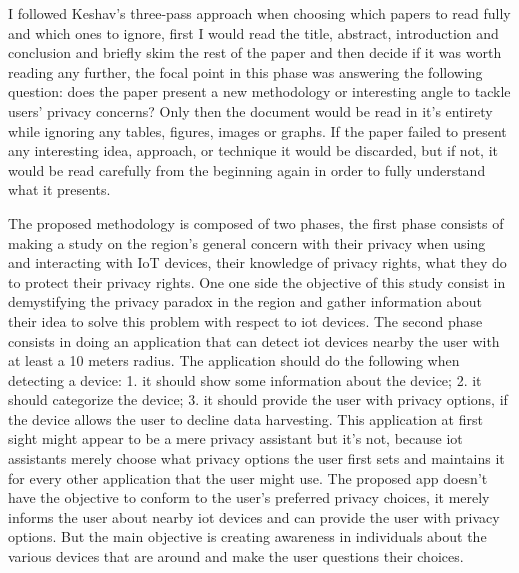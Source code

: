 \documentclass[conference]{IEEEtran}
\begin{document}
I followed Keshav's three-pass approach \cite{KeshavHow} when choosing which
papers to read fully and which ones to ignore, first I would read the title, abstract,
introduction and conclusion and briefly skim the rest of the paper and then
decide if it was worth reading any further, the focal point in this phase was
answering the following question: does the paper present a new methodology or
interesting angle to tackle users' privacy concerns? Only then the document would
be read in it's entirety while ignoring any tables, figures, images or graphs.
If the paper failed to present any interesting idea, approach, or
technique it would be discarded, but if not, it would be read carefully from
the beginning again in order to fully understand what it presents.




The proposed methodology is composed of two phases, the first phase consists of
making a study on the region's general concern with their privacy when
using and interacting with IoT devices, their knowledge of privacy rights, what they do to
protect their privacy rights. One one side the objective of this study
consist in demystifying the privacy paradox in the region and gather
information about their idea to solve this problem with respect
to iot devices.
The second phase consists in doing an application that can detect iot devices
nearby the user with at least a 10 meters radius. The application should
do the following when detecting a device:
1. it should show some information about the device;
2. it should categorize the device;
3. it should provide the user with privacy options, if the device allows the
user to decline data harvesting.
This application at first sight might appear to be a mere privacy assistant but
it's not, because iot assistants merely choose what privacy options
the user first sets and maintains it for every other application that the user
might use. The proposed app doesn't have the objective to conform to the
user's preferred privacy choices, it merely informs the user about nearby iot
devices and can provide the user with privacy options. But the main objective
is creating awareness in individuals about the various devices that are around
and make the user questions their choices.
\end{document}
